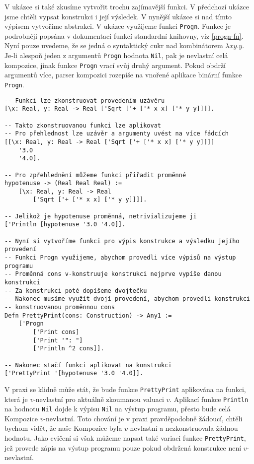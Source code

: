 V ukázce si také zkusíme vytvořit trochu zajímavější funkci. V předchozí ukázce jsme chtěli vypsat
konstrukci i její výsledek. V nynější ukázce si nad tímto výpisem vytvoříme abstrakci. V ukázce
využijeme funkci \lstinline{Progn}. Funkce je podrobněji popsána v dokumentaci funkcí standardní
knihovny, viz \ref{progn-fn}. Nyní pouze uvedeme, že se jedná o syntaktický cukr
nad kombinátorem $\lambda x y . y$. Je-li alespoň jeden z argumentů \lstinline{Progn} hodnota
\lstinline{Nil}, pak je nevlastní celá kompozice, jinak funkce \lstinline{Progn} vrací svůj druhý
argument. Pokud obdrží argumentů více, parser kompozici rozepíše na vnořené aplikace binární funkce
\lstinline{Progn}.

\begin{lstlisting}[caption={Funkce a uzávěry}, language=Tilscript]
-- Funkci lze zkonstruovat provedením uzávěru
[\x: Real, y: Real -> Real ['Sqrt ['+ ['* x x] ['* y y]]]].

-- Takto zkonstruovanou funkci lze aplikovat
-- Pro přehlednost lze uzávěr a argumenty uvést na více řádcích
[[\x: Real, y: Real -> Real ['Sqrt ['+ ['* x x] ['* y y]]]]
    '3.0
    '4.0].

-- Pro zpřehlednění můžeme funkci přiřadit proměnné
hypotenuse -> (Real Real Real) :=
    [\x: Real, y: Real -> Real
        ['Sqrt ['+ ['* x x] ['* y y]]]].

-- Jelikož je hypotenuse proměnná, netrivializujeme ji
['Println [hypotenuse '3.0 '4.0]].

-- Nyní si vytvoříme funkci pro výpis konstrukce a výsledku jejího provedení
-- Funkci Progn využijeme, abychom provedli více výpisů na výstup programu
-- Proměnná cons v-konstruuje konstrukci nejprve vypíše danou konstrukci
-- Za konstrukci poté dopíšeme dvojtečku
-- Nakonec musíme využít dvojí provedení, abychom provedli konstrukci
-- konstruovanou proměnnou cons
Defn PrettyPrint(cons: Construction) -> Any1 :=
    ['Progn
        ['Print cons]
        ['Print '": "]
        ['Println ^2 cons]].

-- Nakonec stačí funkci aplikovat na konstrukci
['PrettyPrint '[hypotenuse '3.0 '4.0]].
\end{lstlisting}

V praxi se klidně může stát, že bude funkce \lstinline{PrettyPrint} aplikována na funkci,
která je $v$-nevlastní pro aktuálně zkoumanou valuaci $v$. Aplikací funkce \lstinline{Println}
na hodnotu \lstinline{Nil} dojde k výpisu \lstinline{Nil} na výstup programu, přesto bude celá
Kompozice $v$-nevlastní. Toto chování je v praxi pravděpodobně žádoucí, chtěli bychom vidět, že naše
Kompozice byla $v$-nevlastní a nezkonstruovala žádnou hodnotu. Jako cvičení si však můžeme napsat
také variaci funkce \lstinline{PrettyPrint}, jež provede zápis na výstup programu pouze pokud
obdržená konstrukce není $v$-nevlastní.

